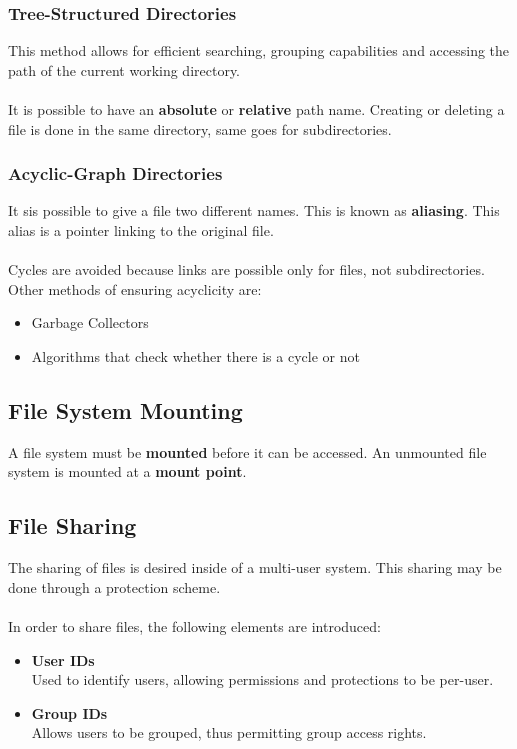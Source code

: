 \documentclass{article}
\begin{document}
\subsubsection{Tree-Structured Directories}
This method allows for efficient searching, grouping capabilities and accessing the path of the current working directory. \\ \\
It is possible to have an \textbf{absolute} or \textbf{relative} path name. Creating or deleting a file is done in the same directory, same goes for subdirectories.

\subsubsection{Acyclic-Graph Directories}
It sis possible to give a file two different names. This is known as \textbf{aliasing}. This alias is a pointer linking to the original file. \\ \\
Cycles are avoided because links are possible only for files, not subdirectories. Other methods of ensuring acyclicity are:

\begin{itemize}
	\item Garbage Collectors
	\item Algorithms that check whether there is a cycle or not
\end{itemize}

\subsection{File System Mounting}
A file system must be \textbf{mounted} before it can be accessed. An unmounted file system is mounted at a \textbf{mount point}.

\subsection{File Sharing}
The sharing of files is desired inside of a multi-user system. This sharing may be done through a protection scheme. \\ \\
In order to share files, the following elements are introduced:

\begin{itemize}
	\item \textbf{User IDs}
	\vspace{.2cm} \\
	Used to identify users, allowing permissions and protections to be per-user.
	
	\item \textbf{Group IDs}
	\vspace{.2cm} \\
	Allows users to be grouped, thus permitting group access rights.
\end{itemize}
\end{document}
